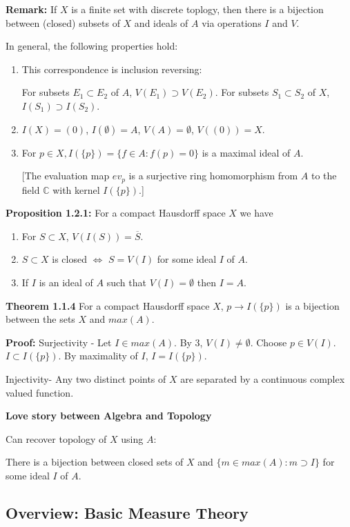 \documentclass[11pt]{article}
\newcommand{\ra}{\rightarrow}
\newcommand{\Lr}{\Leftrightarrow}
\newcommand{\sbs}{\subset}
\newcommand{\sps}{\supset}
\newcommand{\es}{\emptyset}
\newcommand{\co}{\mathbb{C}}
\begin{document}
{\bf Remark:} If $X$ is a finite set with discrete toplogy, then there is a bijection between (closed) subsets of $X$ and ideals of $A$ via operations $I$ and $V$. 


In general, the following properties hold:
\begin{enumerate}
\item This correspondence is inclusion reversing:

For subsets $E_1\sbs E_2$ of $A$, $V(E_1) \sps V(E_2)$. For subsets $S_1\sbs S_2$ of $X$, $I(S_1)\sps I(S_2)$.
\item $I(X)=(0)$, $I(\es)=A$, $V(A)=\es$, $V((0))=X$.
\item For $p\in X, I(\{p\})=\{f \in A : f(p)=0\}$ is a maximal ideal of $A$.

[The evaluation map $ev_p$ is a surjective ring homomorphism from $A$ to the field $\co$ with kernel $I(\{p\})$.]
\end{enumerate}


{\bf Proposition 1.2.1:} For a compact Hausdorff space $X$ we have
\begin{enumerate}
\item For $S\sbs X$, $V(I(S))=\overline S$.
\item $S\sbs X$ is closed $\Lr$ $S=V(I)$ for some ideal $I$ of $A$.
\item If $I$ is an ideal of $A$ such that $V(I)=\es$ then $I=A$.
\end{enumerate}
{\bf Theorem 1.1.4} For a compact Hausdorff space $X$, $p\ra I(\{p\})$ is a bijection between the sets $X$ and $max(A)$.

{\bf Proof:} Surjectivity - Let $I\in max(A)$. By 3, $V(I)\neq \es$. Choose $p \in V(I)$.  $I\sbs I(\{p\})$. By maximality of $I$, $I=I(\{p\})$. 

Injectivity- Any two distinct points of $X$ are separated by a continuous complex valued function.

{\bf Love story between Algebra and Topology}

Can recover topology of $X$ using $A$:

There is a bijection between closed sets of $X$ and $\{m\in max(A): m\sps I\}$ for some ideal $I$ of $A$.














\subsection{Overview: Basic Measure Theory}
\end{document}
